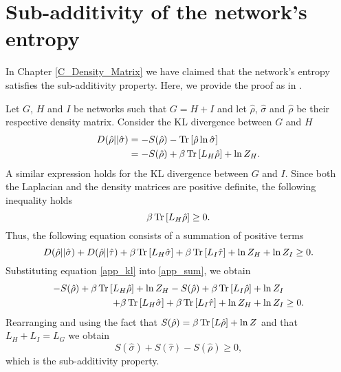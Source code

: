 \chapter{Sub-additivity of the network's entropy}\label{C_sub_additivity}
In Chapter \ref{C_Density_Matrix} we have claimed that the network's entropy satisfies the sub-additivity property. Here, we provide the proof as in \cite{De_Domenico_2016}.

Let $G$, $H$ and $I$ be networks such that $G = H + I$ and let $\hat\rho$, $\hat\sigma$ and $\hat\rho$ be their respective density matrix.
Consider the KL divergence between $G$ and $H$
\begin{equation}\label{app_kl}
    \begin{aligned}
        D(\hat\rho||\hat\sigma) &= - S(\hat\rho)- \operatorname{Tr}\left[\hat\rho\ln\hat\sigma\right] \\
        &= - S(\hat\rho)+ \beta\operatorname{Tr}\left[L_H\hat\rho\right] + \ln Z_H .
    \end{aligned}
\end{equation}
A similar expression holds for the KL divergence between $G$ and $I$. Since both the Laplacian and the density matrices are positive definite, the following inequality holds
\begin{equation}
    \beta\operatorname{Tr}\left[L_H\hat\rho\right]  \geq 0.
\end{equation}
Thus, the following equation consists of a summation of positive terms
\begin{equation}\label{app_sum}
    D(\hat\rho||\hat\sigma)+D(\hat\rho||\hat\tau) +\beta\operatorname{Tr}\left[L_H\hat\sigma\right] +\beta\operatorname{Tr}\left[L_I\hat\tau\right] +\ln Z_H +\ln Z_I\geq 0.
\end{equation} 
Substituting equation \eqref{app_kl} into \eqref{app_sum}, we obtain
\begin{equation}
    \begin{split}
        - S(\hat\rho)+ \beta\operatorname{Tr}\left[L_H\hat\rho\right] + \ln Z_H - S(\hat\rho) +\beta\operatorname{Tr}\left[L_I\hat\rho\right] + \ln Z_I& \\
        +\beta\operatorname{Tr}\left[L_H\hat\sigma\right] +\beta\operatorname{Tr}\left[L_I\hat\tau\right] +\ln Z_H +\ln Z_I&\geq 0.
    \end{split}
\end{equation}
Rearranging and using the fact that $S(\hat\rho) = \beta \operatorname{Tr}\left[L\hat\rho\right] + \ln Z$ and that $L_H + L_I = L_G$ we obtain
\begin{equation}
    S(\hat\sigma) + S(\hat\tau) -  S(\hat\rho)\geq 0,
\end{equation}
which is the sub-additivity property.